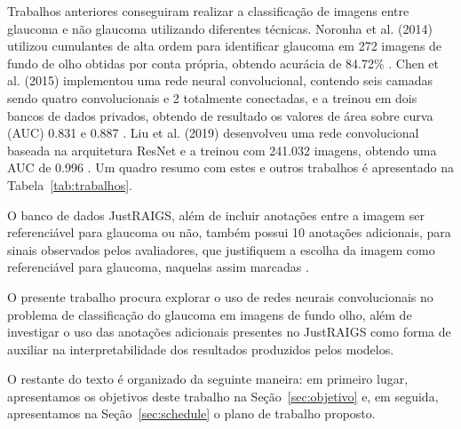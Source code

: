 \documentclass[12pt]{article}
\begin{document}
Trabalhos anteriores conseguiram realizar a classificação de imagens entre glaucoma e não glaucoma utilizando diferentes técnicas. Noronha et al. (2014) utilizou cumulantes de alta ordem para identificar glaucoma em 272 imagens de fundo de olho obtidas por conta própria, obtendo acurácia de 84.72\% \cite{noronha2014hoc}. Chen et al. (2015) implementou uma rede neural convolucional, contendo seis camadas sendo quatro convolucionais e 2 totalmente conectadas, e a treinou em dois bancos de dados privados, obtendo de resultado os valores de área sobre curva (AUC) 0.831 e 0.887 \cite{chen2015cnn}. Liu et al. (2019) desenvolveu uma rede convolucional baseada na arquitetura ResNet e a treinou com 241.032 imagens, obtendo uma AUC de 0.996 \cite{liu_cnn_2019}. Um quadro resumo com estes e outros trabalhos é apresentado na Tabela~\ref{tab:trabalhos}.

O banco de dados JustRAIGS, além de incluir anotações entre a imagem ser referenciável para glaucoma ou não, também possui 10 anotações adicionais, para sinais observados pelos avaliadores, que justifiquem a escolha da imagem como referenciável para glaucoma, naquelas assim marcadas \cite{justraigs_article}.

O presente trabalho procura explorar o uso de redes neurais convolucionais no problema de classificação do glaucoma em imagens de fundo olho, além de investigar o uso das anotações adicionais presentes no JustRAIGS como forma de auxiliar na interpretabilidade dos resultados produzidos pelos modelos.

O restante do texto é organizado da seguinte maneira: em primeiro lugar, apresentamos os objetivos deste trabalho na Seção~\ref{sec:objetivo} e, em seguida, apresentamos na Seção~\ref{sec:schedule} o plano de trabalho proposto.
\end{document}
